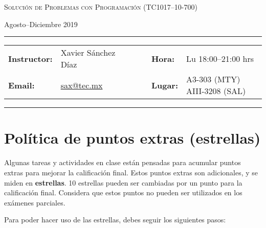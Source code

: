 \documentclass[12pt, letterpaper, oneside]{article}
\makeatletter
\newcommand{\thecourse}{Solución de Problemas con Programación (TC1017--10-700)}
\newcommand{\thesemester}{Agosto--Diciembre 2019}
\newcommand{\theinstructor}{Xavier Sánchez Díaz}
\newcommand{\themail}{sax@tec.mx}
\newcommand{\thetime}{Lu 18:00--21:00 hrs}
\newcommand{\theplace}{\scriptsize A3-303 (MTY) AIII-3208 (SAL)}
\makeatother
\begin{document}
  \begin{center}
  {\Large \textsc{\thecourse}}
  \end{center}
  \begin{center}
  \thesemester
  \end{center}

  \begin{center}
  \rule{6in}{0.4pt}
  \begin{minipage}[t]{.75\textwidth}
  \begin{tabular}{llcccll}
  \textbf{Instructor:} & \theinstructor & & &  & \textbf{Hora:} & \thetime \\
  \textbf{Email:} &  \href{mailto:sax@tec.mx}{\themail} & & & & \textbf{Lugar:} & \theplace
  \end{tabular}
  \end{minipage}
  \rule{6in}{0.4pt}
  \end{center}
  \vspace{.5cm}
  \setlength{\unitlength}{1in}
  \renewcommand{\arraystretch}{2}

  \section{Política de puntos extras (estrellas)}

  Algunas tareas y actividades en clase están pensadas para acumular puntos extras para mejorar la calificación final.
  Estos puntos extras son adicionales, y se miden en \textbf{estrellas}.
  10 estrellas pueden ser cambiadas por un punto para la calificación final.
  Considera que estos puntos no pueden ser utilizados en los exámenes parciales.

  Para poder hacer uso de las estrellas, debes seguir los siguientes pasos:
\end{document}
